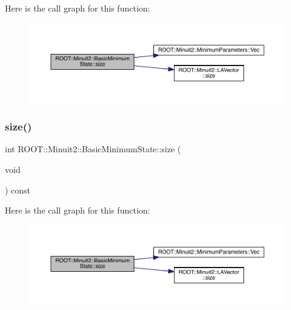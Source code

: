 Here is the call graph for this function\+:
\nopagebreak
\begin{figure}[H]
\begin{center}
\leavevmode
\includegraphics[width=350pt]{d0/db1/classROOT_1_1Minuit2_1_1BasicMinimumState_a12c3b0b51b127384c53029c54c984590_cgraph}
\end{center}
\end{figure}
\mbox{\label{classROOT_1_1Minuit2_1_1BasicMinimumState_a12c3b0b51b127384c53029c54c984590}} 
\subsubsection{\texorpdfstring{size()}{size()}\hspace{0.1cm}{\footnotesize\ttfamily [3/3]}}
{\footnotesize\ttfamily int R\+O\+O\+T\+::\+Minuit2\+::\+Basic\+Minimum\+State\+::size (\begin{DoxyParamCaption}\item[{void}]{ }\end{DoxyParamCaption}) const\hspace{0.3cm}{\ttfamily [inline]}}

Here is the call graph for this function\+:
\nopagebreak
\begin{figure}[H]
\begin{center}
\leavevmode
\includegraphics[width=350pt]{d0/db1/classROOT_1_1Minuit2_1_1BasicMinimumState_a12c3b0b51b127384c53029c54c984590_cgraph}
\end{center}
\end{figure}
\mbox{\label{classROOT_1_1Minuit2_1_1BasicMinimumState_a43ea742b5bd55d2c4e9d6b75308fb875}} 
